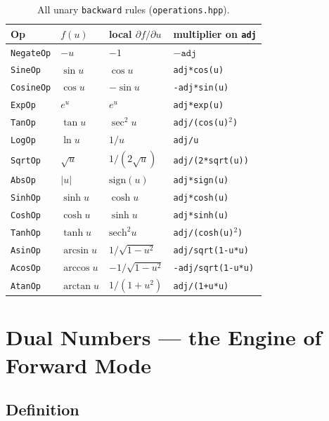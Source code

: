 \documentclass[11pt,a4paper]{article}
\newcommand{\code}[1]{\texttt{#1}}
\begin{document}
\begin{table}[h]
\centering\small
\renewcommand{\arraystretch}{1.3}
\begin{tabular}{llll}
\toprule
\textbf{Op} & $f(u)$ & local $\partial f/\partial u$ & multiplier on \code{adj} \\
\midrule
\code{NegateOp}  & $-u$         & $-1$              & $-\texttt{adj}$ \\
\code{SineOp}    & $\sin u$     & $\cos u$          & \code{adj*cos(u)} \\
\code{CosineOp}  & $\cos u$     & $-\sin u$         & \code{-adj*sin(u)} \\
\code{ExpOp}     & $e^u$        & $e^u$             & \code{adj*exp(u)} \\
\code{TanOp}     & $\tan u$     & $\sec^2 u$        & \code{adj/(cos(u)$^2$)} \\
\code{LogOp}     & $\ln u$      & $1/u$             & \code{adj/u} \\
\code{SqrtOp}    & $\sqrt{u}$   & $1/(2\sqrt{u})$   & \code{adj/(2*sqrt(u))} \\
\code{AbsOp}     & $|u|$        & $\text{sign}(u)$  & \code{adj*sign(u)} \\
\code{SinhOp}    & $\sinh u$    & $\cosh u$         & \code{adj*cosh(u)} \\
\code{CoshOp}    & $\cosh u$    & $\sinh u$         & \code{adj*sinh(u)} \\
\code{TanhOp}    & $\tanh u$    & $\text{sech}^2 u$ & \code{adj/(cosh(u)$^2$)} \\
\code{AsinOp}    & $\arcsin u$  & $1/\sqrt{1-u^2}$  & \code{adj/sqrt(1-u*u)} \\
\code{AcosOp}    & $\arccos u$  & $-1/\sqrt{1-u^2}$ & \code{-adj/sqrt(1-u*u)} \\
\code{AtanOp}    & $\arctan u$  & $1/(1+u^2)$       & \code{adj/(1+u*u)} \\
\bottomrule
\end{tabular}
\caption{All unary \texttt{backward} rules (\texttt{operations.hpp}).}
\end{table}

\section{Dual Numbers --- the Engine of Forward Mode}
\label{sec:dual}

\subsection{Definition}
\end{document}
